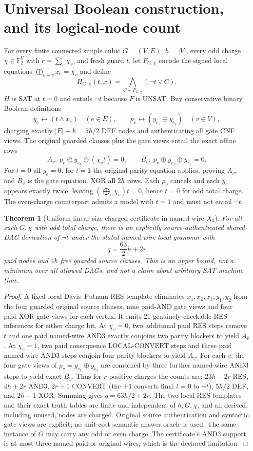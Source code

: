 \documentclass[11pt]{article}
\newtheorem{theorem}{Theorem}
\begin{document}
\section*{Universal Boolean construction, and its logical-node count}
For every finite connected simple cubic $G=(V,E)$, $h=|V|$, every odd charge $\chi\in\mathbb F_2^V$ with $r=\sum_v\chi_v$, and fresh guard $t$, let $F_{G,\chi}$ encode the signed local equations $\bigoplus_{e\ni v}x_e=\chi_v$ and define
\[
H_{G,\chi}(t,x)=\bigwedge_{C\in F_{G,\chi}}(\neg t\vee C).
\]
$H$ is SAT at $t=0$ and entails $\neg t$ because $F$ is UNSAT. Buy conservative binary Boolean definitions
\[
y_e\leftrightarrow(t\land x_e)\quad(e\in E),\qquad
p_v\leftrightarrow(y_{e_1}\oplus y_{e_2})\quad(v\in V),
\]
charging exactly $|E|+h=5h/2$ DEF nodes and authenticating all gate CNF views. The original guarded clauses plus the gate views entail the exact affine rows
\[
 A_v:\ p_v\oplus y_{e_3}\oplus(\chi_v t)=0,\qquad
 B_v:\ p_v\oplus y_{e_1}\oplus y_{e_2}=0.
\]
For $t=0$ all $y_e=0$; for $t=1$ the original parity equation applies, proving $A_v$, and $B_v$ is the gate equation. XOR all $2h$ rows. Each $p_v$ cancels and each $y_e$ appears exactly twice, leaving $(\bigoplus_v\chi_v)t=0$, hence $t=0$ for odd total charge. The even-charge counterpart admits a model with $t=1$ and must not entail $\neg t$.

\begin{theorem}[Uniform linear-size charged certificate in named-wire $X_3$]
For all such $G,\chi$ with odd total charge, there is an explicitly source-authenticated shared-DAG derivation of $\neg t$ under the stated named-wire local grammar with
\[
\boxed{q=\frac{63}{2}h+2r}
\]
paid nodes and $4h$ free guarded source clauses. This is an \emph{upper bound}, not a minimum over all allowed DAGs, and not a claim about arbitrary SAT machine time.
\end{theorem}
\begin{proof}
A fixed local Davis--Putnam RES template eliminates $x_1,x_2,x_3,y_1,y_2$ from the four guarded original source clauses, nine paid-AND gate views and four paid-XOR gate views for each vertex. It emits 21 genuinely checkable RES inferences for either charge bit. At $\chi_v=0$, two additional paid RES steps remove $t$ and one paid named-wire AND3 exactly conjoins two parity blockers to yield $A_v$. At $\chi_v=1$, two paid consequence LOCAL-CONVERT steps and three paid named-wire AND3 steps conjoin four parity blockers to yield $A_v$. For each $v$, the four gate views of $p_v=y_{e_1}\oplus y_{e_2}$ are combined by three further named-wire AND3 steps to yield exact $B_v$. Thus for $r$ positive charges the counts are: $23h-2r$ RES, $4h+2r$ AND3, $2r+1$ CONVERT (the $+1$ converts final $t=0$ to $\neg t$), $5h/2$ DEF, and $2h-1$ XOR. Summing gives $q=63h/2+2r$. The two local RES templates and their exact truth tables are finite and independent of $h,G,\chi$, and all derived, including unused, nodes are charged. Original source authentication and syntactic gate views are explicit; no unit-cost semantic answer oracle is used. The same instance of $G$ may carry any odd or even charge. The certificate's AND3 support is at most three named paid-or-original wires, which is the declared limitation.
\end{proof}
\end{document}
